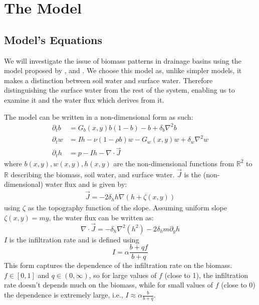 \documentclass{article}
\numberwithin{equation}{section}
\begin{document}
\section{The Model}
\subsection{Model's Equations}
We will investigate the issue of biomass patterns in drainage basins using the model proposed by \cite{gilad_phys_2004}, and \cite{gilad_mathematical_2007}. We choose this model as, unlike simpler models, it makes a distinction between soil water and surface water. Therefore distinguishing the surface water from the rest of the system, enabling us to examine it and the water flux which derives from it.

The model can be written in a non-dimensional form as such:
\begin{align}
    \partial_t b & = G_b(x,y) b(1-b) - b + \delta_b\nabla^2 b              \\
    \partial_t w & = Ih - \nu(1-\rho b)w - G_w(x,y)w + \delta_w \nabla^2 w \\
    \partial_t h & = p - Ih - \nabla \cdot \vec{J}
\end{align}
where $b(x,y),w(x,y),h(x,y)$ are the non-dimensional functions from $\mathbb{R}^2$ to $\mathbb{R}$ describing the biomass, soil water, and surface water. $\vec{J}$ is the (non-dimensional) water flux and is given by:
\begin{align}
    \label{eq:flux_def}
    \vec{J} =  -2\delta_h h\nabla\left(h+\zeta(x,y)\right)
\end{align}
using $\zeta$ as the topography function of the slope. Assuming uniform slope $\zeta(x,y)=my$, the water flux can be written as:
\begin{equation}
    \nabla \cdot \vec{J} = -\delta_h \nabla^2(h^2) - 2\delta_h m \partial_y h
\end{equation}
$I$ is the infiltration rate and is defined using
\begin{equation}
    I = \alpha \frac{b+qf}{b+q}
\end{equation}
This form captures the dependence of the infiltration rate on the biomass. $f\in[0,1]$ and $q\in(0,\infty)$, so for large values of $f$ (close to 1), the infiltration rate doesn't depends much on the biomass, while for small values of $f$ (close to 0) the dependence is extremely large, i.e., $I\approx \alpha\frac{b}{b+q}$.
\end{document}
